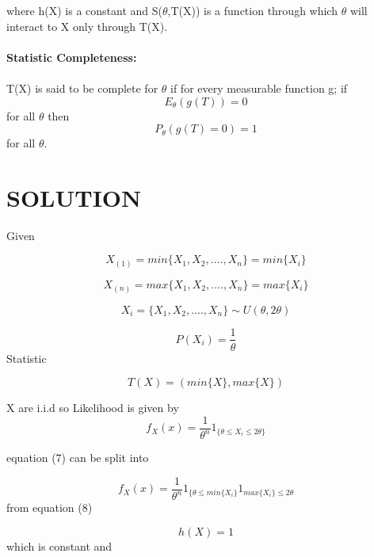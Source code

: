 \documentclass[journal,12pt,twocolumn]{IEEEtran}
\begin{document}
where h(X) is a constant and S($\theta$,T(X)) is a function through which $\theta$ will interact to X only through T(X).\\ \\
\textbf{Statistic Completeness:}\\ \\
T(X) is said to be complete for $\theta$ if for every measurable function g;
if 
\begin{equation}
    {E_\theta}(g(T))=0 
\end{equation}
for all $\theta$ then
\begin{equation}
    P_\theta(g(T)=0)=1 
\end{equation}
for all $\theta$.\\
\section{\textbf{SOLUTION}}
Given

\begin{equation}
      X_{(1)} =min\{X_1,X_2,....,X_n\}=min\{X_i\}
\end{equation}

\begin{equation}
    X_{(n)}=max\{X_1,X_2,....,X_n\}=max\{X_i\}
\end{equation}

\begin{equation}
    X_i=\{X_1,X_2,....,X_n\}\sim U(\theta,2\theta)
\end{equation}

\begin{equation}
    P(X_i)=\dfrac{1}{\theta}
\end{equation}
Statistic

\begin{equation}
    T(X)=(min\{X\},max\{X\})
\end{equation}

X are i.i.d so Likelihood is given by 
\begin{equation}
    f_X(x)=\frac{1}{\theta^n}1_{\{\theta\leq X_i \leq2\theta\}}
\end{equation}

equation (7) can be split into

\begin{equation}
    f_X(x)=\frac{1}{\theta^n}1_{\{\theta\leq min\{X_i\}}1_{max\{ X_i\}\leq2\theta}
\end{equation}
from equation (8) 

\begin{equation}
    h(X)=1
\end{equation}
 which is constant and
 
\end{document}
